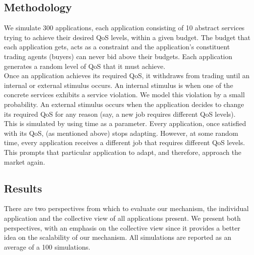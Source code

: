 \documentclass[10pt,journal,compsoc]{IEEEtran}
\begin{document}
\subsection{Methodology}
We simulate 300 applications, each application consisting of 10 abstract services trying to achieve their desired QoS levels, within a given budget. The budget that each application gets, acts as a constraint and the application's constituent trading agents (buyers) can never bid above their budgets. Each application generates a random level of QoS that it must achieve.\\
Once an application achieves its required QoS, it withdraws from trading until an internal or external stimulus occurs. An internal stimulus is when one of the concrete services exhibits a service violation. We model this violation by a small probability. An external stimulus occurs when the application decides to change its required QoS for any reason (say, a new job requires different QoS levels). This is simulated by using time as a parameter. Every application, once satisfied with its QoS, (as mentioned above) stops adapting. However, at some random time, every application receives a different job that requires different QoS levels. This prompts that particular application to adapt, and therefore, approach the market again.
\subsection{Results}
There are two perspectives from which to evaluate our mechanism, the individual application and the collective view of all applications present. We present both perspectives, with an emphasis on the collective view since it provides a better idea on the scalability of our mechanism. All simulations are reported as an average of a 100 simulations.\\
\end{document}
